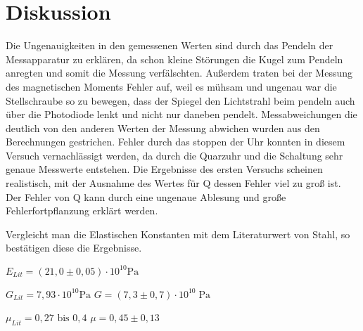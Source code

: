 \newpage
\section{Diskussion}
\label{sec:Diskussion}
Die Ungenauigkeiten in den gemessenen Werten sind durch das Pendeln der Messapparatur zu erklären,
 da schon kleine Störungen die Kugel zum Pendeln anregten und somit die Messung verfälschten.
Außerdem traten bei der Messung des magnetischen Moments Fehler auf,
 weil es mühsam und ungenau war die Stellschraube so zu bewegen,
  dass der Spiegel den Lichtstrahl beim pendeln auch über die Photodiode lenkt und nicht nur daneben pendelt.
Messabweichungen die deutlich von den anderen Werten der Messung abwichen wurden aus den Berechnungen gestrichen.
Fehler durch das stoppen der Uhr konnten in diesem Versuch vernachlässigt werden,
 da durch die Quarzuhr und die Schaltung sehr genaue Messwerte entstehen.
Die Ergebnisse des ersten Versuchs scheinen realistisch, mit der Ausnahme des Wertes für Q dessen Fehler viel zu groß ist.\\
Der Fehler von Q kann durch eine ungenaue Ablesung und große Fehlerfortpflanzung erklärt werden.

Vergleicht man die Elastischen Konstanten mit dem Literaturwert von Stahl, so bestätigen
diese die Ergebnisse.\newline

  $E_{Lit}=(21,0\pm 0,05)\cdot 10^{10}\textrm{Pa}$ \newline
  

  $G_{Lit}=7,93\cdot 10^{10}\textrm{Pa}$ \cite{lit_G}\newline
  $G = (7,3 \pm 0,7 )\cdot 10^{10}\;\mathrm{Pa}$\\\newline

  $\mu_{Lit}=0,27 \textrm{ bis } 0,4$  \cite{lit_mu}\newline
  $\mu = 0,45 \pm 0,13$
